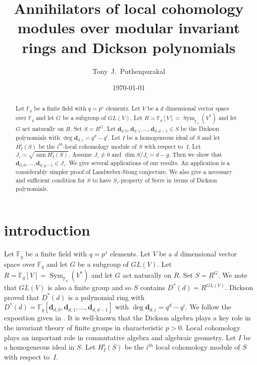 \documentclass{amsart}
\newcommand{\wrt}{with respect to}
\newcommand{\F}{\mathbb{F} }
\newcommand{\db}{\mathbf{d} }
\newcommand{\ann}{\operatorname{ann}}
\newcommand{\Sym}{\operatorname{Sym}}
\theoremstyle{plain}
\theoremstyle{definition}
\theoremstyle{remark}
\begin{document}
\title[Annihilators of local cohomology modules]{Annihilators of local cohomology modules over modular invariant rings and Dickson polynomials}
\author{Tony~J.~Puthenpurakal}
\date{\today}
\address{Department of Mathematics, IIT Bombay, Powai, Mumbai 400 076, India}


 \begin{abstract}
Let $\F_q$ be a finite field with $q = p^s$ elements. Let $V$ be a $d$ dimensional vector space over $\F_q$ and let $G$ be a subgroup of $GL(V)$. Let $R = \F_q[V] = \Sym_{\F_q}(V^*)$ and let $G$ act naturally on $R$. Set $S = R^G$. Let $\db_{d,0}, \db_{d, 1}, \ldots, \db_{d, d-1} \in S$ be the Dickson polynomials with $\deg \db_{d,i} = q^d - q^i$. Let $I$ be a homogeneous ideal of $S$ and let $H^i_I(S)$ be the $i^{th}$-local cohomology module of $S$ \wrt \ $I$. Let $J_i = \sqrt{\ann H^i_I(S)}$. Assume $J_i \neq 0$ and $\dim S/J_i = d - g$. Then we show that
$\db_{d,0}, \ldots, \db_{d, g - 1} \in J_i$. We give several applications of our results. An application is a considerably simpler proof of Landweber-Stong conjecture. We also give a necessary and sufficient condition for $S$ to have $S_r$-property of Serre in terms of Dickson  polynomials.
\end{abstract}
 \maketitle
\section{introduction}
\s \label{setup}Let $\F_q$ be a finite field with $q = p^s$ elements. Let $V$ be a $d$ dimensional vector space over $\F_q$ and let $G$ be a subgroup of $GL(V)$. Let $R = \F_q[V] = \Sym_{\F_q}(V^*)$ and let $G$ act naturally on $R$. Set $S = R^G$. We note that $GL(V)$ is also a finite group and so $S$ contains $D^*(d) = R^{GL(V)}$. Dickson proved that $D^*(d)$ is a polynomial ring with
$D^*(d) = \F_q[ \db_{d,0}, \db_{d, 1}, \ldots, \db_{d, d-1}]$ with $\deg \db_{d,i} = q^d - q^i$. We follow the exposition given in \cite{SL}. It is well-known that the  Dickson algebra plays a key role in the invariant theory of finite groups in characteristic $p > 0$.
Local cohomology plays an important role in commutative algebra and algebraic geometry. Let $I$ be a homogeneous ideal in $S$. Let $H^i_I(S)$ be the $i^{th}$ local cohomology module of $S$ \wrt \ $I$.
\end{document}
